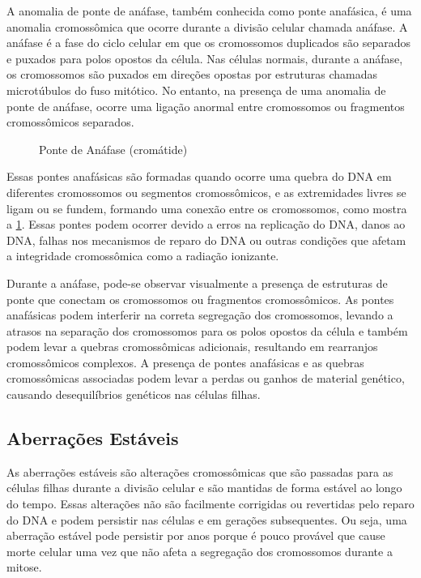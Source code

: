 \documentclass[11pt,a4paper]{article}
\begin{document}
	A anomalia de ponte de anáfase, também conhecida como ponte anafásica, é uma anomalia cromossômica que ocorre durante a divisão celular chamada anáfase. A anáfase é a fase do ciclo celular em que os cromossomos duplicados são separados e puxados para polos opostos da célula. Nas células normais, durante a anáfase, os cromossomos são puxados em direções opostas por estruturas chamadas microtúbulos do fuso mitótico. No entanto, na presença de uma anomalia de ponte de anáfase, ocorre uma ligação anormal entre cromossomos ou fragmentos cromossômicos separados.

	\begin{figure}
		\caption{Ponte de Anáfase (cromátide)}
		\label{fig:ponteDeAnafase}
	\end{figure}

	Essas pontes anafásicas são formadas quando ocorre uma quebra do DNA em diferentes cromossomos ou segmentos cromossômicos, e as extremidades livres se ligam ou se fundem, formando uma conexão entre os cromossomos, como mostra a \ref{fig:ponteDeAnafase}. Essas pontes podem ocorrer devido a erros na replicação do DNA, danos ao DNA, falhas nos mecanismos de reparo do DNA ou outras condições que afetam a integridade cromossômica como a radiação ionizante.

	Durante a anáfase, pode-se observar visualmente a presença de estruturas de ponte que conectam os cromossomos ou fragmentos cromossômicos. As pontes anafásicas podem interferir na correta segregação dos cromossomos, levando a atrasos na separação dos cromossomos para os polos opostos da célula e também podem levar a quebras cromossômicas adicionais, resultando em rearranjos cromossômicos complexos. A presença de pontes anafásicas e as quebras cromossômicas associadas podem levar a perdas ou ganhos de material genético, causando desequilíbrios genéticos nas células filhas.

\subsection{Aberrações Estáveis}

	As aberrações estáveis são alterações cromossômicas que são passadas para as células filhas durante a divisão celular e são mantidas de forma estável ao longo do tempo. Essas alterações não são facilmente corrigidas ou revertidas pelo reparo do DNA e podem persistir nas células e em gerações subsequentes. Ou seja, uma aberração estável pode persistir por anos porque é pouco provável que cause morte celular uma vez que não afeta a segregação dos cromossomos durante a mitose.
\end{document}
